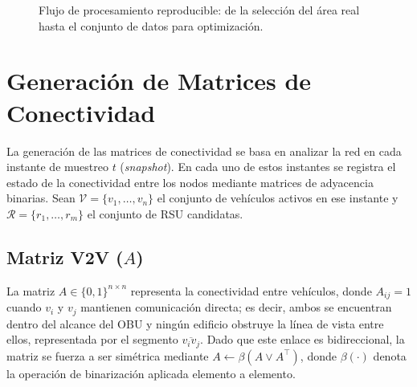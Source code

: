 \documentclass[smartcities,article,submit,oneauthor]{Definitions/mdpi}
\newcommand{\bin}[1]{\beta\!\left(#1\right)}
\begin{document}
\begin{figure}[H]
\centering
{}
\caption{Flujo de procesamiento reproducible: de la selección del área real hasta
el conjunto de datos para optimización.\label{fig:pipeline}}
\end{figure}

\section{Generación de Matrices de Conectividad}\label{sec:matrices}

La generación de las matrices de conectividad se basa en analizar la red en cada
instante de muestreo $t$ (\emph{snapshot}). En cada uno de estos instantes se registra
el estado de la conectividad entre los nodos mediante matrices de adyacencia binarias.
Sean $\mathcal{V}=\{v_1,\dots,v_n\}$ el conjunto de vehículos activos en ese instante
y $\mathcal{R}=\{r_1,\dots,r_m\}$ el conjunto de RSU candidatas.

\subsection{Matriz V2V ($A$)}
La matriz $A\in\{0,1\}^{n\times n}$ representa la conectividad entre vehículos, donde
$A_{ij}=1$ cuando $v_i$ y $v_j$ mantienen comunicación directa; es decir, ambos se
encuentran dentro del alcance del OBU y ningún edificio obstruye la línea de vista
entre ellos, representada por el segmento $\overline{v_i v_j}$. Dado que este enlace
es bidireccional, la matriz se fuerza a ser simétrica mediante
$A \leftarrow \bin{A \vee A^{\top}}$, donde $\beta(\cdot)$ denota la operación de
binarización aplicada elemento a elemento.
\end{document}
